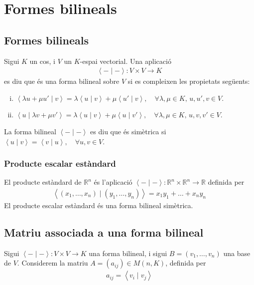 \section{Formes bilineals}
\subsection{Formes bilineals}
Sigui $K$ un cos, i $V$ un $K$-espai vectorial. Una aplicació
\begin{align}
    \left< - \mid - \right>: V \times V \to K
\end{align}
es diu que és una forma bilineal sobre $V$ si es compleixen les propietats següents:
\begin{enumerate}[i)]
    \item $\left< \lambda u + \mu u' \mid v \right> = \lambda \left< u \mid v \right> + \mu \left< u' \mid v \right>, \quad \forall \lambda , \mu \in K , \, u , u' , v \in V$.
    \item $\left< u \mid \lambda v + \mu v' \right> = \lambda \left< u \mid v \right> + \mu \left< u \mid v' \right>, \quad \forall \lambda , \mu \in K , \, u , v , v' \in V$.
\end{enumerate}
La forma bilineal $\left< - \mid - \right>$ es diu que és simètrica si $\left< u \mid v \right> = \left< v \mid u \right>, \quad \forall u , v \in V$.

\subsubsection*{Producte escalar estàndard}
El producte estàndard de $\mathbb{R}^{n}$ és l'aplicació $\left< - \mid - \right>: \mathbb{R}^{n} \times \mathbb{R}^{n} \to \mathbb{R}$ definida per
\begin{align}
    \left< (x_{1}, \dots , x_{n}) \mid (y_{1}, \dots , y_{n}) \right> = x_{1} y_{1} + \dots + x_{n} y_{n}
\end{align}
El producte escalar estàndard és una forma bilineal simètrica.

\subsection{Matriu associada a una forma bilineal}
Sigui $\left< - \mid - \right>: V \times V \to K$ una forma bilineal, i sigui $B = ( v_{1}, \dots , v_{n} )$ una base de $V$. Considerem la matriu $A = (a_{ij}) \in M(n,K)$, definida per 
\begin{align}
    a_{ij} = \left< v_{i} \mid v_{j} \right>
\end{align}

